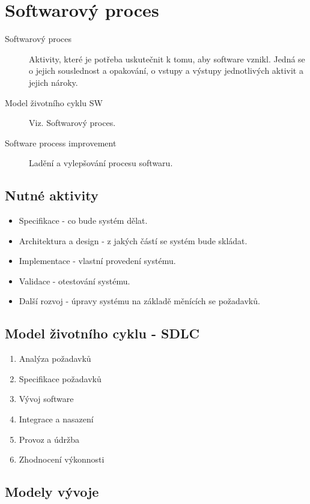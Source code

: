 \section{Softwarový proces}
  \begin{description}
    \item[Softwarový proces] Aktivity, které je potřeba uskutečnit k tomu, aby software vznikl.
    Jedná se o jejich souslednost a opakování, o vstupy a výstupy jednotlivých aktivit a jejich nároky.
    \item[Model životního cyklu SW] Viz. Softwarový proces.
    \item[Software process improvement] Ladění a vylepšování procesu softwaru.
  \end{description}

  \subsection{Nutné aktivity}
  \begin{itemize}
    \item Specifikace - co bude systém dělat.
    \item Architektura a design - z jakých částí se systém bude skládat.
    \item Implementace - vlastní provedení systému.
    \item Validace - otestování systému.
    \item Další rozvoj - úpravy systému na základě měnících se požadavků.
  \end{itemize}

  \subsection{Model životního cyklu - SDLC}
    \begin{enumerate}
      \item Analýza požadavků
      \item Specifikace požadavků
      \item Vývoj software
      \item Integrace a nasazení
      \item Provoz a údržba
      \item Zhodnocení výkonnosti
    \end{enumerate}


  \subsection{Modely vývoje}


